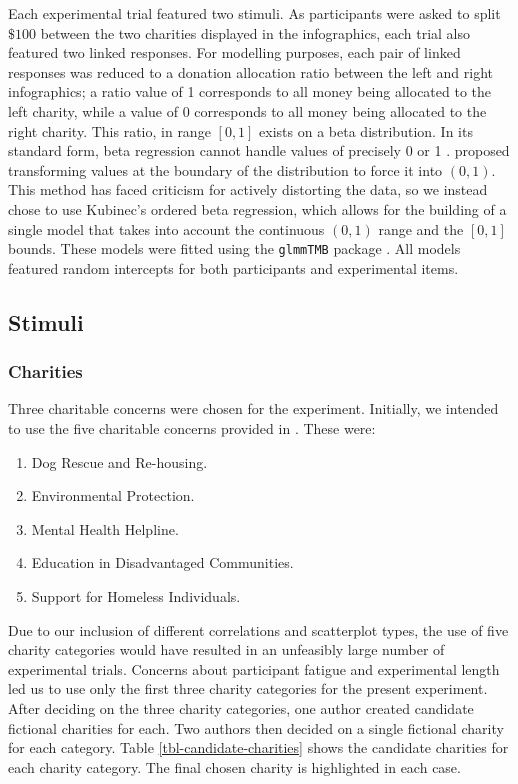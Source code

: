 \documentclass[
  authoryear,
  preprint,
  3p]{elsarticle}
\providecommand{\tightlist}{%
  \setlength{\itemsep}{0pt}\setlength{\parskip}{0pt}}
\begin{document}
Each experimental trial featured two stimuli. As participants were asked
to split \(\$100\) between the two charities displayed in the
infographics, each trial also featured two linked responses. For
modelling purposes, each pair of linked responses was reduced to a
donation allocation ratio between the left and right infographics; a
ratio value of 1 corresponds to all money being allocated to the left
charity, while a value of 0 corresponds to all money being allocated to
the right charity. This ratio, in range \([0,1]\) exists on a beta
distribution. In its standard form, beta regression cannot handle values
of precisely 0 or 1 \citep{ferrari_2004}. \citet{smithson_2006} proposed
transforming values at the boundary of the distribution to force it into
\((0,1)\). This method has faced criticism for actively distorting the
data, so we instead chose to use Kubinec's \citeyearpar{kubinec_2022}
ordered beta regression, which allows for the building of a single model
that takes into account the continuous \((0,1)\) range and the \([0,1]\)
bounds. These models were fitted using the \texttt{glmmTMB} package
\citep[version 1.1.14,][]{mcgillycuddy_2025}. All models featured random
intercepts for both participants and experimental items.

\subsection{Stimuli}\label{sec-stimuli}

\subsubsection{Charities}\label{sec-stimuli-charities}

Three charitable concerns were chosen for the experiment. Initially, we
intended to use the five charitable concerns provided in
\citet{she_2023}. These were:

\begin{enumerate}
\def\labelenumi{\arabic{enumi}.}
\tightlist
\item
  Dog Rescue and Re-housing.
\item
  Environmental Protection.
\item
  Mental Health Helpline.
\item
  Education in Disadvantaged Communities.
\item
  Support for Homeless Individuals.
\end{enumerate}

Due to our inclusion of different correlations and scatterplot types,
the use of five charity categories would have resulted in an unfeasibly
large number of experimental trials. Concerns about participant fatigue
and experimental length led us to use only the first three charity
categories for the present experiment. After deciding on the three
charity categories, one author created candidate fictional charities for
each. Two authors then decided on a single fictional charity for each
category. Table \ref{tbl-candidate-charities} shows the candidate
charities for each charity category. The final chosen charity is
highlighted in each case.
\end{document}
